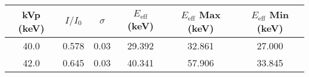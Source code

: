 \begin{tabular}{cccccc}
\toprule
 kVp (keV) &  $I/I_0$ &  $\sigma$ &  $E_{\text{eff}}$ (keV) &  $E_{\text{eff}}$ Max (keV) &  $E_{\text{eff}}$ Min (keV) \\
\midrule
      40.0 &               0.578 &                                   0.03 &                  29.392 &                      32.861 &                      27.000 \\
      42.0 &               0.645 &                                   0.03 &                  40.341 &                      57.906 &                      33.845 \\
\bottomrule
\end{tabular}
